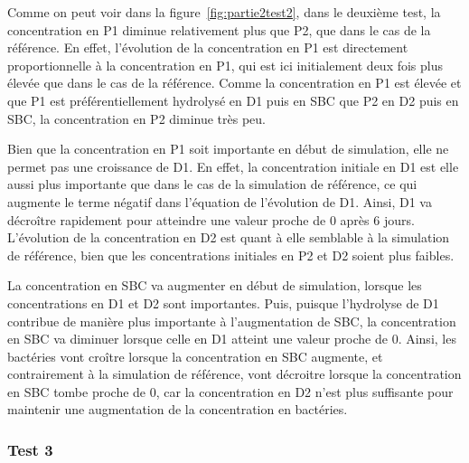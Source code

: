 \par{
Comme on peut voir dans la figure~\ref{fig:partie2test2}, dans le deuxième test,
la concentration en P1 diminue relativement plus que P2, que dans le cas de la r\'ef\'erence. En effet, l'\'evolution de la concentration en P1 est directement proportionnelle \`a la concentration en P1, qui est ici initialement deux fois plus \'elev\'ee que dans le cas de la r\'ef\'erence. Comme la concentration en P1 est \'elev\'ee et que P1 est pr\'ef\'erentiellement hydrolys\'e en D1 puis en SBC que P2 en D2 puis en SBC, la concentration en P2 diminue tr\`es peu.
}
\par{
Bien que la concentration en P1 soit importante en d\'ebut de simulation, elle ne permet pas une croissance de D1. En effet, la concentration initiale en D1 est elle aussi plus importante que dans le cas de la simulation de r\'ef\'erence, ce qui augmente le terme n\'egatif dans l'\'equation de l'\'evolution de D1. Ainsi, D1 va d\'ecro\^itre rapidement pour atteindre une valeur proche de 0 apr\`es 6 jours. L'\'evolution de la concentration en D2 est quant \`a elle semblable \`a la simulation de r\'ef\'erence, bien que les concentrations initiales en P2 et D2 soient plus faibles.
}
\par{
La concentration en SBC va augmenter en d\'ebut de simulation, lorsque les concentrations en D1 et D2 sont importantes. Puis, puisque l'hydrolyse de D1 contribue de mani\`ere plus importante \`a l'augmentation de SBC, la concentration en SBC va diminuer lorsque celle en D1 atteint une valeur proche de 0. Ainsi, les bact\'eries vont cro\^itre lorsque la concentration en SBC augmente, et contrairement \`a la simulation de r\'ef\'erence, vont d\'ecroitre lorsque la concentration en SBC tombe proche de 0, car la concentration en D2 n'est plus suffisante pour maintenir une augmentation de la concentration en bact\'eries.
}

\FloatBarrier
\newpage
\subsubsection{Test 3}


